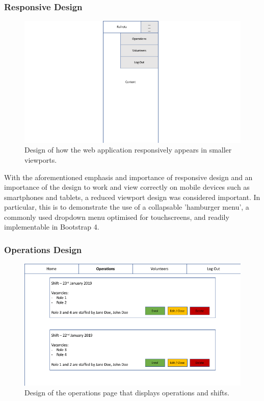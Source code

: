 \subsubsection{Responsive Design}
\begin{figure}[!ht]
    \includegraphics[width=1.0\textwidth]{Figures/design-mobile}
    \caption{Design of how the web application responsively appears in smaller viewports.}
    \label{fig:mobile}
\end{figure}

With the aforementioned emphasis and importance of responsive design and an importance of the design to work and view correctly on mobile devices such as smartphones and tablets, a reduced viewport design was considered important. In particular, this is to demonstrate the use of a collapsable 'hamburger menu', a commonly used dropdown menu optimised for touchscreens, and readily implementable in Bootstrap 4. \cite{Bootstrap4}

\subsubsection{Operations Design}
\begin{figure}[!ht]
    \includegraphics[width=1.0\textwidth]{Figures/design-operations}
    \caption{Design of the operations page that displays operations and shifts.}
    \label{fig:operations}
\end{figure}

